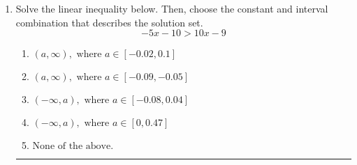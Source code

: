 \documentclass[14pt]{extbook}
\newcommand{\litem}[1]{\item#1\hspace*{-1cm}\rule{\textwidth}{0.4pt}}
\begin{document}
\begin{enumerate}
{\begin{enumerate}[label=\Alph*.]
\end{enumerate} }
\litem{
Solve the linear inequality below. Then, choose the constant and interval combination that describes the solution set.\[ -5x -10 > 10x -9 \]\begin{enumerate}[label=\Alph*.]
\item \( (a, \infty), \text{ where } a \in [-0.02, 0.1] \)
\item \( (a, \infty), \text{ where } a \in [-0.09, -0.05] \)
\item \( (-\infty, a), \text{ where } a \in [-0.08, 0.04] \)
\item \( (-\infty, a), \text{ where } a \in [0, 0.47] \)
\item \( \text{None of the above}. \)

\end{enumerate} }
\end{enumerate}
\end{document}
